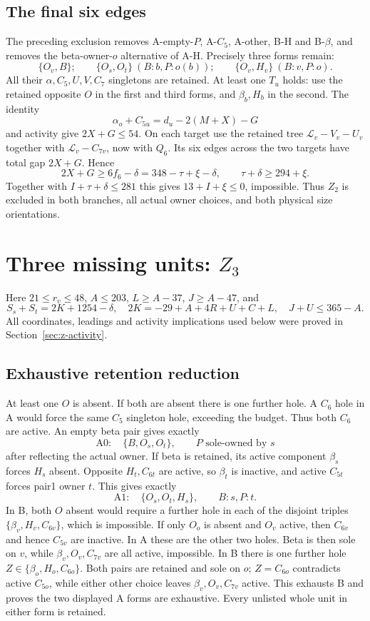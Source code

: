 \documentclass[11pt,letterpaper]{article}
\theoremstyle{definition}\newtheorem{definition}[theorem]{Definition}
\begin{document}
\subsection{The final six edges}
The preceding exclusion removes A-empty-$P$, A-$C_5$, A-other, B-H and B-$\beta$, and removes the beta-owner-$o$ alternative of A-H. Precisely three forms remain:
\[
 \{O_v,B\};\qquad \{O_s,O_t\}\ (B:b,P:o(b));\qquad
 \{O_v,H_v\}\ (B:v,P:o).
\]
All their $\alpha,C_5,U,V,C_7$ singletons are retained. At least one $T_u$ holds: use the retained opposite $O$ in the first and third forms, and $\beta_b,H_b$ in the second. The identity
\[
 \alpha_o+C_{5u}=d_u-2(M+X)-G
\]
and activity give $2X+G\le54$. On each target use the retained tree $\mathcal L_v-V_v-U_v$ together with $\mathcal L_v-C_{7v}$, now with $Q_6$. Its six edges across the two targets have total gap $2X+G$. Hence
\[
 2X+G\ge6f_6-\delta=348-\tau+\xi-\delta,
 \qquad \tau+\delta\ge294+\xi.
\]
Together with $I+\tau+\delta\le281$ this gives $13+I+\xi\le0$, impossible. Thus $Z_2$ is excluded in both branches, all actual owner choices, and both physical size orientations.


\section{Three missing units: $Z_3$}\label{sec:Z3}
Here $21\le r_v\le48$, $A\le203$, $L\ge A-37$, $J\ge A-47$, and
\begin{equation}\label{eq:z3-source}
 S_s+S_t=2K+1254-\delta,\quad
 2K=-29+A+4R+U+C+L,\quad J+U\le365-A.
\end{equation}
All coordinates, leadings and activity implications used below were proved in Section~\ref{sec:z-activity}.

\subsection{Exhaustive retention reduction}
At least one $O$ is absent. If both are absent there is one further hole. A $C_6$ hole in A would force the same $C_5$ singleton hole, exceeding the budget. Thus both $C_6$ are active. An empty beta pair gives exactly
\[
 \text{A0}:\quad\{B,O_s,O_t\},\qquad P\text{ sole-owned by }s
\]
after reflecting the actual owner. If beta is retained, its active component $\beta_s$ forces $H_s$ absent. Opposite $H_t,C_{6t}$ are active, so $\beta_t$ is inactive, and active $C_{5t}$ forces pair1 owner $t$. This gives exactly
\[
 \text{A1}:\quad\{O_s,O_t,H_s\},\qquad B:s, P:t.
\]
In B, both $O$ absent would require a further hole in each of the disjoint triples $\{\beta_v,H_v,C_{6v}\}$, which is impossible.
If only $O_o$ is absent and $O_v$ active, then $C_{6v}$ and hence $C_{5v}$ are inactive. In A these are the other two holes. Beta is then sole on $v$, while $\beta_v,O_v,C_{7v}$ are all active, impossible. In B there is one further hole $Z\in\{\beta_o,H_o,C_{6o}\}$. Both pairs are retained and sole on $o$; $Z=C_{6o}$ contradicts active $C_{5o}$, while either other choice leaves $\beta_v,O_v,C_{7v}$ active. This exhausts B and proves the two displayed A forms are exhaustive. Every unlisted whole unit in either form is retained.
\end{document}
